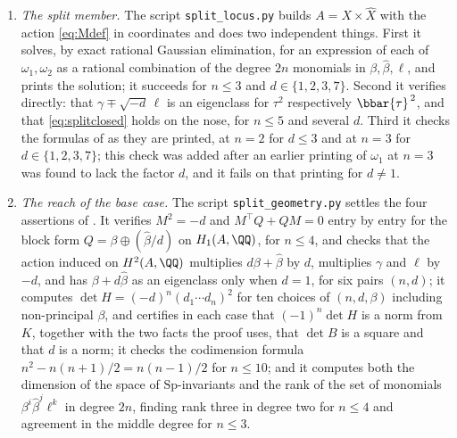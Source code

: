 \begin{enumerate}[label=\textup{(\Roman*)},leftmargin=*]
\item \emph{The split member.} The script \texttt{split\_locus.py} builds
  $A=X\times\widehat{X}$ with the action \eqref{eq:Mdef} in coordinates and
  does two independent things. First it solves, by exact rational Gaussian
  elimination, for an expression of each of $\omega_{1},\omega_{2}$ as a
  rational combination of the degree $2n$ monomials in
  $\beta,\widehat{\beta},\ell$, and prints the solution; it succeeds for
  $n\le3$ and $d\in\{1,2,3,7\}$. Second it verifies
   directly: that $\gamma\mp\sqrt{-d}\,\ell$ is an
  eigenclass for $\tau^{2}$ respectively $\bbar{\tau}^{\,2}$, and that
  \eqref{eq:splitclosed} holds on the nose, for $n\le5$ and several $d$.
  Third it checks the formulas of  as they are printed,
  at $n=2$ for $d\le3$ and at $n=3$ for $d\in\{1,2,3,7\}$; this check was
  added after an earlier printing of $\omega_{1}$ at $n=3$ was found to lack
  the factor $d$, and it fails on that printing for $d\ne1$.

\item \emph{The reach of the base case.} The script
  \texttt{split\_geometry.py} settles the four assertions of
  . It verifies $M^{2}=-d$ and $M^{\top}Q+QM=0$ entry by
  entry for the block form $Q=\beta\oplus(\widehat\beta/d)$ on
  $H_{1}(A,\QQ)$, for $n\le4$, and checks that the action induced on
  $H^{2}(A,\QQ)$ multiplies $d\beta+\widehat\beta$ by $d$, multiplies
  $\gamma$ and $\ell$ by $-d$, and has $\beta+d\widehat\beta$ as an eigenclass
  only when $d=1$, for six pairs $(n,d)$; it
  computes $\det H=(-d)^{n}(d_{1}\cdots d_{n})^{2}$ for ten choices of
  $(n,d,\beta)$ including non-principal $\beta$, and certifies in each case
  that $(-1)^{n}\det H$ is a norm from $K$, together with the two facts the
  proof uses, that $\det B$ is a square and that $d$ is a norm; it checks the
  codimension formula $n^{2}-n(n+1)/2=n(n-1)/2$ for $n\le10$; and it computes
  both the dimension of the space of $\mathrm{Sp}$-invariants and the rank of
  the set of monomials $\beta^{i}\widehat{\beta}^{j}\ell^{k}$ in degree $2n$,
  finding rank three in degree two for $n\le4$ and agreement in the middle
  degree for $n\le3$.


\end{enumerate}
